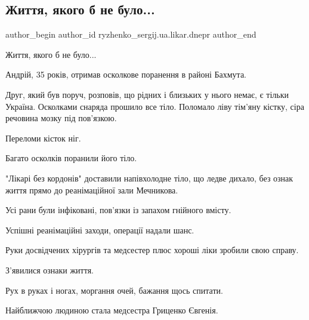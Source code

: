  
 
 
 
 
 
\subsection{Життя, якого б не було...}
\label{sec:12_11_2022.fb.ryzhenko_sergij.ua.likar.dnepr.1.zhyttja_jakogo_b_ne_bulo}
 
\ifcmt
 author_begin
   author_id ryzhenko_sergij.ua.likar.dnepr
 author_end
\fi

Життя, якого б не було...


Андрій, 35 років, отримав осколкове поранення в районі Бахмута.  

Друг, який був поруч, розповів, що рідних і близьких у нього немає, є тільки
Україна.  Осколками снаряда прошило все тіло.  Поломало ліву тім'яну кістку,
сіра речовина мозку під пов'язкою.

Переломи кісток ніг. 

Багато осколків поранили його тіло.

"Лікарі без кордонів" доставили напівхолодне тіло, що ледве дихало, без ознак
життя прямо до реанімаційної зали Мечникова.  

Усі рани були інфіковані, пов'язки із запахом гнійного вмісту.  

Успішні реанімаційні заходи, операції надали шанс.  

Руки досвідчених хірургів та медсестер плюс хороші ліки зробили свою справу.  

З'явилися ознаки життя.  

Рух в руках і ногах, моргання очей, бажання щось спитати. 

Найближчою людиною стала медсестра Гриценко Євгенія. 

